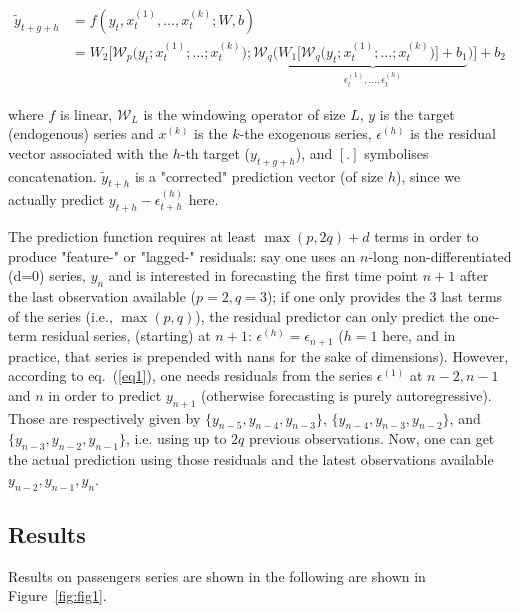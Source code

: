 \documentclass{article}
\begin{document}
\begin{equation}
  \label{eq3}
  \begin{aligned}
    \widetilde{y}_{t+g+h} &= f(y_t, x^{(1)}_t, \dots, x^{(k)}_t; W, b)\\
                          &= W_{2} \Big[\mathcal{W}_p\big(y_t; x^{(1)}_t; \dots; x^{(k)}_t\big) ; \mathcal{W}_q \Big( \underbrace{W_{1} \big[\mathcal{W}_q \big(y_t; x^{(1)}_t; \dots;x^{(k)}_t\big) \big] + b_{1}}_{\epsilon^{(1)}_t, \dots, \epsilon^{(h)}_t} \Big) \Big] + b_{2}
  \end{aligned}
\end{equation}

where $f$ is linear, $\mathcal{W}_{L}$ is the windowing operator of size $L$, $y$ is the target (endogenous) series and $x^{(k)}$ is the $k$-the exogenous series, $\epsilon^{(h)}$ is the residual vector associated with the $h$-th target ($y_{t+g+h}$), and $[.]$ symbolises concatenation. $\widetilde{y}_{t+h}$ is a "corrected" prediction vector (of size $h$), since we actually predict $y_{t+h} - \epsilon^{(h)}_{t+h}$ here. 

The prediction function requires at least $\max(p,2q)+d$ terms in order to produce "feature-" or "lagged-" residuals: say one uses an $n$-long non-differentiated (d=0) series, $y_n$ and is interested in forecasting the first time point $n+1$ after the last observation available ($p=2, q=3$); if one only provides the 3 last terms of the series (i.e., $\max(p,q)$), the residual predictor can only predict the one-term residual series, (starting) at $n+1$: $\epsilon^{(h)}=\epsilon_{n+1}$ ($h=1$ here, and in practice, that series is prepended with nans for the sake of dimensions). However, according to eq.~(\ref{eq1}), one needs residuals from the series $\epsilon^{(1)}$ at $n-2,n-1$ and $n$ in order to predict $y_{n+1}$ (otherwise forecasting is purely autoregressive). Those are respectively given by $\{y_{n-5},y_{n-4},y_{n-3}\}$, $\{y_{n-4},y_{n-3},y_{n-2}\}$, and $\{y_{n-3},y_{n-2},y_{n-1}\}$, i.e. using up to $2q$ previous observations. Now, one can get the actual prediction using those residuals and the latest observations available $y_{n-2},y_{n-1},y_{n}$.


\subsection{Results}
Results on passengers series are shown in the following are shown in Figure~\ref{fig:fig1}.
\end{document}
